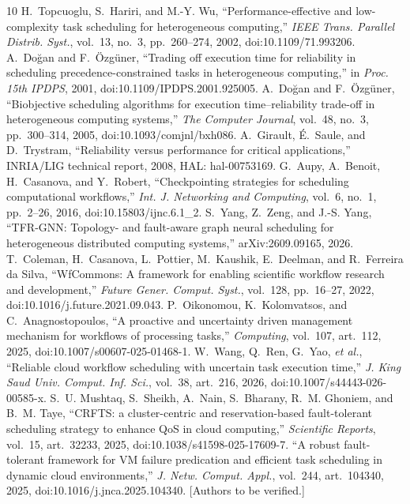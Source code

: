 \documentclass[10pt,twocolumn,letterpaper]{article}
\begin{document}
\begin{thebibliography}{10}\small
{} H.~Topcuoglu, S.~Hariri, and M.-Y. Wu, ``Performance-effective and low-complexity task scheduling for heterogeneous computing,'' \emph{IEEE Trans. Parallel Distrib. Syst.}, vol.~13, no.~3, pp.~260--274, 2002, doi:10.1109/71.993206.
 A.~Doğan and F.~Özgüner, ``Trading off execution time for reliability in scheduling precedence-constrained tasks in heterogeneous computing,'' in \emph{Proc. 15th IPDPS}, 2001, doi:10.1109/IPDPS.2001.925005.
 A.~Doğan and F.~Özgüner, ``Biobjective scheduling algorithms for execution time--reliability trade-off in heterogeneous computing systems,'' \emph{The Computer Journal}, vol.~48, no.~3, pp.~300--314, 2005, doi:10.1093/comjnl/bxh086.
 A.~Girault, É.~Saule, and D.~Trystram, ``Reliability versus performance for critical applications,'' INRIA/LIG technical report, 2008, HAL: hal-00753169.
 G.~Aupy, A.~Benoit, H.~Casanova, and Y.~Robert, ``Checkpointing strategies for scheduling computational workflows,'' \emph{Int. J. Networking and Computing}, vol.~6, no.~1, pp.~2--26, 2016, doi:10.15803/ijnc.6.1\_2.
 S.~Yang, Z.~Zeng, and J.-S. Yang, ``TFR-GNN: Topology- and fault-aware graph neural scheduling for heterogeneous distributed computing systems,'' arXiv:2609.09165, 2026.
 T.~Coleman, H.~Casanova, L.~Pottier, M.~Kaushik, E.~Deelman, and R.~Ferreira da Silva, ``WfCommons: A framework for enabling scientific workflow research and development,'' \emph{Future Gener. Comput. Syst.}, vol.~128, pp.~16--27, 2022, doi:10.1016/j.future.2021.09.043.
 P.~Oikonomou, K.~Kolomvatsos, and C.~Anagnostopoulos, ``A proactive and uncertainty driven management mechanism for workflows of processing tasks,'' \emph{Computing}, vol.~107, art.~112, 2025, doi:10.1007/s00607-025-01468-1.
 W.~Wang, Q.~Ren, G.~Yao, \emph{et al.}, ``Reliable cloud workflow scheduling with uncertain task execution time,'' \emph{J. King Saud Univ. Comput. Inf. Sci.}, vol.~38, art.~216, 2026, doi:10.1007/s44443-026-00585-x.
 S.~U. Mushtaq, S.~Sheikh, A.~Nain, S.~Bharany, R.~M. Ghoniem, and B.~M. Taye, ``CRFTS: a cluster-centric and reservation-based fault-tolerant scheduling strategy to enhance QoS in cloud computing,'' \emph{Scientific Reports}, vol.~15, art.~32233, 2025, doi:10.1038/s41598-025-17609-7.
 ``A robust fault-tolerant framework for VM failure predication and efficient task scheduling in dynamic cloud environments,'' \emph{J. Netw. Comput. Appl.}, vol.~244, art.~104340, 2025, doi:10.1016/j.jnca.2025.104340. [Authors to be verified.]

\end{thebibliography}
\end{document}
